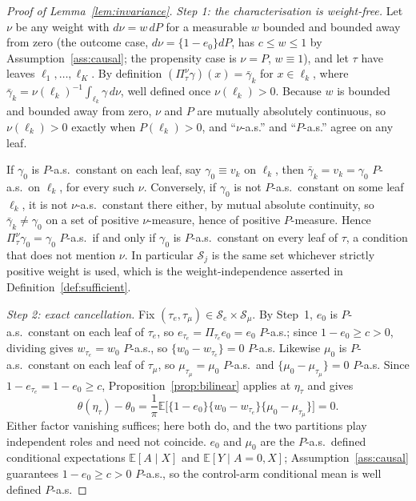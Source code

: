 \documentclass[11pt]{article}
\theoremstyle{plain}
\theoremstyle{definition}
\theoremstyle{remark}
\newcommand{\E}{\mathbb{E}}
\newcommand{\cS}{\mathcal{S}}
\newcommand{\ez}{e_0}
\newcommand{\mz}{\mu_0}
\newcommand{\wz}{w_0}
\begin{document}
\begin{proof}[Proof of Lemma~\ref{lem:invariance}]
\emph{Step 1: the characterisation is weight-free.} Let $\nu$ be any weight
with $d\nu=w\,dP$ for a measurable $w$ bounded and bounded away from zero
(the outcome case, $d\nu=\{1-\ez\}dP$, has $c\le w\le1$ by
Assumption~\ref{ass:causal}; the propensity case is $\nu=P$, $w\equiv1$), and
let $\tau$ have leaves $\ell_1,\dots,\ell_K$. By definition
$(\Pi^\nu_\tau\gamma)(x)=\bar\gamma_k$ for $x\in\ell_k$, where
$\bar\gamma_k=\nu(\ell_k)^{-1}\int_{\ell_k}\gamma\,d\nu$, well defined once
$\nu(\ell_k)>0$. Because $w$ is bounded and bounded away from zero, $\nu$ and
$P$ are mutually absolutely continuous, so $\nu(\ell_k)>0$ exactly when
$P(\ell_k)>0$, and ``$\nu$-a.s.'' and ``$P$-a.s.'' agree on any leaf.

If $\gamma_0$ is $P$-a.s.\ constant on each leaf, say $\gamma_0\equiv v_k$ on
$\ell_k$, then $\bar\gamma_k=v_k=\gamma_0$ $P$-a.s.\ on $\ell_k$, for every
such $\nu$. Conversely, if $\gamma_0$ is not $P$-a.s.\ constant on some leaf
$\ell_k$, it is not $\nu$-a.s.\ constant there either, by mutual absolute
continuity, so $\bar\gamma_k\ne\gamma_0$ on a set of positive $\nu$-measure,
hence of positive $P$-measure. Hence $\Pi^\nu_\tau\gamma_0=\gamma_0$
$P$-a.s.\ if and only if $\gamma_0$ is $P$-a.s.\ constant on every leaf of
$\tau$, a condition that does not mention $\nu$. In particular $\cS_j$ is the
same set whichever strictly positive weight is used, which is the
weight-independence asserted in Definition~\ref{def:sufficient}.

\emph{Step 2: exact cancellation.} Fix
$(\tau_e,\tau_\mu)\in\cS_e\times\cS_\mu$. By Step~1, $\ez$ is $P$-a.s.\
constant on each leaf of $\tau_e$, so $e_{\tau_e}=\Pi_{\tau_e}\ez=\ez$
$P$-a.s.; since $1-\ez\ge c>0$, dividing gives $w_{\tau_e}=\wz$ $P$-a.s., so
$\{\wz-w_{\tau_e}\}=0$ $P$-a.s. Likewise $\mz$ is $P$-a.s.\ constant on each
leaf of $\tau_\mu$, so $\mu_{\tau_\mu}=\mz$ $P$-a.s.\ and
$\{\mz-\mu_{\tau_\mu}\}=0$ $P$-a.s. Since $1-e_{\tau_e}=1-\ez\ge c$,
Proposition~\ref{prop:bilinear} applies at $\eta_\tau$ and gives
\[
  \theta(\eta_\tau)-\theta_0
  =\frac1\pi\E\bigl[\{1-\ez\}\{\wz-w_{\tau_e}\}\{\mz-\mu_{\tau_\mu}\}\bigr]=0 .
\]
Either factor vanishing suffices; here both do, and the two partitions play
independent roles and need not coincide. $\ez$ and $\mz$ are the $P$-a.s.\
defined conditional expectations $\E[A\mid X]$ and $\E[Y\mid A=0,X]$;
Assumption~\ref{ass:causal} guarantees $1-\ez\ge c>0$ $P$-a.s., so the
control-arm conditional mean is well defined $P$-a.s.
\end{proof}
\end{document}
